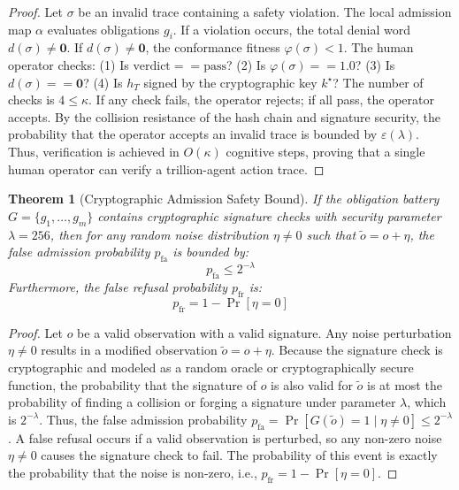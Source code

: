 \documentclass[11pt,oneside]{book}
\theoremstyle{definition}
\theoremstyle{plain}
\newtheorem{theorem}{Theorem}[chapter]
\theoremstyle{remark}
\newcommand{\adm}{\alpha}                      %
\newcommand{\CL}{\kappa}                       %
\newcommand{\Fitness}{\varphi}
\begin{document}
\begin{proof}
Let $\sigma$ be an invalid trace containing a safety violation. %
The local admission map $\adm$ evaluates obligations $g_i$. %
If a violation occurs, the total denial word $d(\sigma) \neq \mathbf{0}$. %
If $d(\sigma) \neq \mathbf{0}$, the conformance fitness $\Fitness(\sigma) < 1$. %
The human operator checks: (1) Is $\text{verdict} == \text{pass}$? %
(2) Is $\Fitness(\sigma) == 1.0$? %
(3) Is $d(\sigma) == \mathbf{0}$? %
(4) Is $h_T$ signed by the cryptographic key $k^\star$? %
The number of checks is $4 \le \CL$. %
If any check fails, the operator rejects; if all pass, the operator accepts. %
By the collision resistance of the hash chain and signature security, the probability that the operator accepts an invalid trace is bounded by $\varepsilon(\lambda)$. %
Thus, verification is achieved in $O(\CL)$ cognitive steps, proving that a single human operator can verify a trillion-agent action trace. %
\end{proof}

\begin{theorem}[Cryptographic Admission Safety Bound]\label{thm:crypto_safety}
If the obligation battery $G = \{g_1, \dots, g_m\}$ contains cryptographic signature checks with security parameter $\lambda = 256$, then for any random noise distribution $\eta \neq 0$ such that $\tilde{o} = o + \eta$, the false admission probability $p_{\mathrm{fa}}$ is bounded by: %
\[
p_{\mathrm{fa}} \le 2^{-\lambda}
\]
Furthermore, the false refusal probability $p_{\mathrm{fr}}$ is: %
\[
p_{\mathrm{fr}} = 1 - \Pr[\eta = 0]
\]
\end{theorem}

\begin{proof}
Let $o$ be a valid observation with a valid signature. %
Any noise perturbation $\eta \neq 0$ results in a modified observation $\tilde{o} = o + \eta$. %
Because the signature check is cryptographic and modeled as a random oracle or cryptographically secure function, the probability that the signature of $o$ is also valid for $\tilde{o}$ is at most the probability of finding a collision or forging a signature under parameter $\lambda$, which is $2^{-\lambda}$. %
Thus, the false admission probability $p_{\mathrm{fa}} = \Pr[G(\tilde{o}) = 1 \mid \eta \neq 0] \le 2^{-\lambda}$. %
A false refusal occurs if a valid observation is perturbed, so any non-zero noise $\eta \neq 0$ causes the signature check to fail. %
The probability of this event is exactly the probability that the noise is non-zero, i.e., $p_{\mathrm{fr}} = 1 - \Pr[\eta = 0]$. %
\end{proof}
\end{document}
